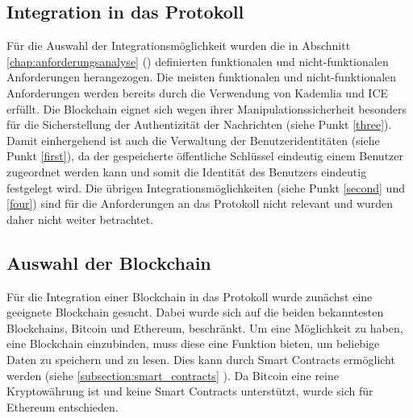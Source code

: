 \subsection{Integration in das Protokoll}

Für die Auswahl der Integrationsmöglichkeit wurden die in Abschnitt \ref{chap:anforderungsanalyse} (\textit{}) definierten funktionalen und nicht-funktionalen Anforderungen herangezogen. Die meisten funktionalen und nicht-funktionalen Anforderungen werden bereits durch die Verwendung von Kademlia und ICE erfüllt. Die Blockchain eignet sich wegen ihrer Manipulationssicherheit besonders für die Sicherstellung der Authentizität der Nachrichten (siehe Punkt \ref{three}). Damit einhergehend ist auch die Verwaltung der Benutzeridentitäten (siehe Punkt \ref{first}), da der gespeicherte öffentliche Schlüssel eindeutig einem Benutzer zugeordnet werden kann und somit die Identität des Benutzers eindeutig festgelegt wird. Die übrigen Integrationsmöglichkeiten (siehe Punkt \ref{second} und \ref{four}) sind für die Anforderungen an das Protokoll nicht relevant und wurden daher nicht weiter betrachtet.


\subsection{Auswahl der Blockchain}
Für die Integration einer Blockchain in das Protokoll wurde zunächst eine geeignete Blockchain gesucht. Dabei wurde sich auf die beiden bekanntesten Blockchains, Bitcoin und Ethereum, beschränkt. Um eine Möglichkeit zu haben, eine Blockchain einzubinden, muss diese eine Funktion bieten, um beliebige Daten zu speichern und zu lesen. Dies kann durch Smart Contracts ermöglicht werden (siehe \ref{subsection:smart_contracts} \textit{}). Da Bitcoin eine reine Kryptowährung ist und keine Smart Contracts unterstützt, wurde sich für Ethereum entschieden. 

